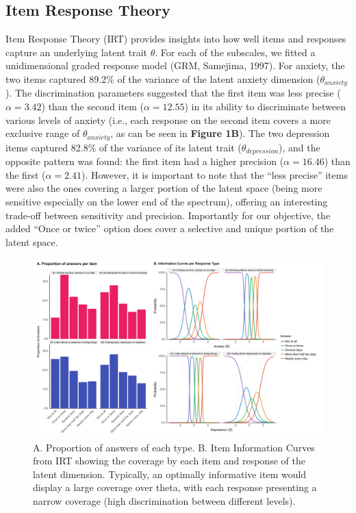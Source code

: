 \documentclass[
  man,floatsintext]{apa6}
\begin{document}
\hypertarget{item-response-theory}{%
\subsection{Item Response Theory}\label{item-response-theory}}

Item Response Theory (IRT) provides insights into how well items and responses capture an underlying latent trait \(\theta\). For each of the subscales, we fitted a unidimensional graded response model (GRM, Samejima, 1997). For anxiety, the two items captured 89.2\% of the variance of the latent anxiety dimension (\(\theta_{anxiety}\)). The discrimination parameters suggested that the first item was less precise (\(\alpha = 3.42\)) than the second item (\(\alpha = 12.55\)) in its ability to discriminate between various levels of anxiety (i.e., each response on the second item covers a more exclusive range of \(\theta_{anxiety}\), as can be seen in \textbf{Figure 1B}). The two depression items captured 82.8\% of the variance of its latent trait (\(\theta_{depression}\)), and the opposite pattern was found: the first item had a higher precision (\(\alpha = 16.46\)) than the first (\(\alpha = 2.41\)). However, it is important to note that the ``less precise'' items were also the ones covering a larger portion of the latent space (being more sensitive especially on the lower end of the spectrum), offering an interesting trade-off between sensitivity and precision. Importantly for our objective, the added ``Once or twice'' option does cover a selective and unique portion of the latent space.

\begin{figure}
\includegraphics[width=1\linewidth]{../figures/figure1} \caption{A. Proportion of answers of each type. B. Item Information Curves from IRT showing the coverage by each item and response of the latent dimension. Typically, an optimally informative item would display a large coverage over theta, with each response presenting a narrow coverage (high discrimination between different levels).}\label{fig:unnamed-chunk-2}
\end{figure}
\end{document}
